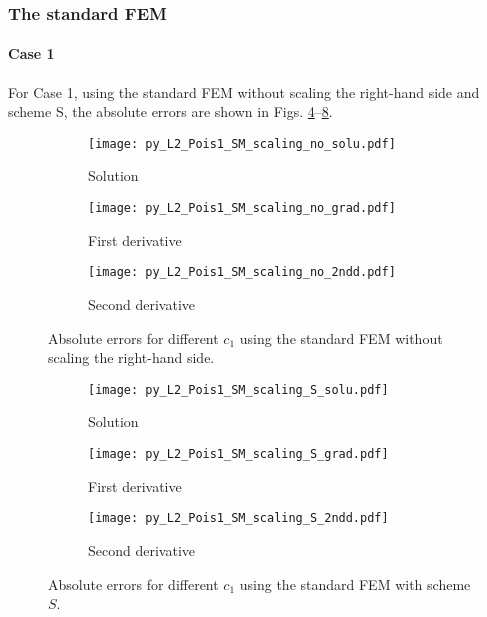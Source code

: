 \documentclass[review,3p]{elsarticle}
\begin{document}
\subsubsection{The standard FEM}


\paragraph{Case 1}
For Case 1, using the standard FEM without scaling the right-hand side and scheme S, the absolute errors are shown in Figs. \ref{py_L2_Pois1_SM_scaling_no}--\ref{py_L2_Pois1_SM_scaling_S}.

\begin{figure}[!ht]
    \begin{subfigure}{5.5cm}
        \texttt{[image: py\_L2\_Pois1\_SM\_scaling\_no\_solu.pdf]}
        \caption{Solution}
        \label{py_L2_Pois1_SM_scaling_no_solu}
    \end{subfigure}
    \hspace{-0.2cm}
    \begin{subfigure}{5.5cm}
        \texttt{[image: py\_L2\_Pois1\_SM\_scaling\_no\_grad.pdf]}
        \caption{First derivative}
        \label{py_L2_Pois1_SM_scaling_no_grad}
    \end{subfigure}
    \hspace{-0.2cm}
    \begin{subfigure}{5.5cm}
        \texttt{[image: py\_L2\_Pois1\_SM\_scaling\_no\_2ndd.pdf]}
        \caption{Second derivative}
        \label{py_L2_Pois1_SM_scaling_no_2ndd}
    \end{subfigure}
\caption{Absolute errors for different $c_1$ using the standard FEM without scaling the right-hand side.}   
\label{py_L2_Pois1_SM_scaling_no}
\end{figure}

\begin{figure}[!ht]
    \begin{subfigure}{5.5cm}
        \texttt{[image: py\_L2\_Pois1\_SM\_scaling\_S\_solu.pdf]}
        \caption{Solution}
        \label{py_L2_Pois1_SM_scaling_S_solu}
    \end{subfigure}
    \hspace{-0.2cm}
    \begin{subfigure}{5.5cm}
        \texttt{[image: py\_L2\_Pois1\_SM\_scaling\_S\_grad.pdf]}
        \caption{First derivative}
        \label{py_L2_Pois1_SM_scaling_S_grad}
    \end{subfigure}
    \hspace{-0.2cm}
    \begin{subfigure}{5.5cm}
        \texttt{[image: py\_L2\_Pois1\_SM\_scaling\_S\_2ndd.pdf]}
        \caption{Second derivative}
        \label{py_L2_Pois1_SM_scaling_S_2ndd}
    \end{subfigure}
\caption{Absolute errors for different $c_1$ using the standard FEM with scheme $S$.}    
\label{py_L2_Pois1_SM_scaling_S}
\end{figure}
\end{document}
